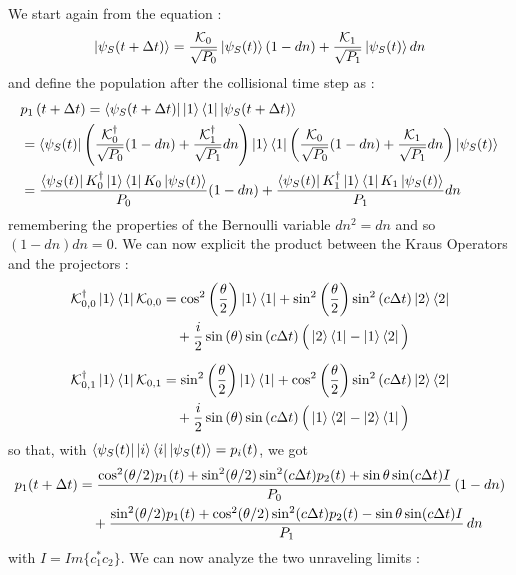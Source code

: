 \documentclass[a4paper,12pt]{article}
\begin{document}
We start again from the equation : 
\begin{equation}
	\ket{\psi_{S}(t + \Delta t)} = \frac{\mathcal{K}_{0}}{\sqrt{P_{0}}} \ket{\psi_{S}(t)} (1 - dn) + \frac{\mathcal{K}_{1}}{\sqrt{P_{1}}} \ket{\psi_{S}(t)} dn
\end{equation}
and define the population after the collisional time step as : 
\begin{align}
	&p_{1} \left( t + \Delta t \right) = \bra{\psi_{S}(t + \Delta t)} \ket{1} \bra{1} \ket{\psi_{S}(t + \Delta t)} \notag \\ 
	&= \bra{\psi_{S}(t)} \left( \frac{\mathcal{K}^{\dagger}_{0}}{\sqrt{P_{0}}}  (1 - dn) + \frac{\mathcal{K}^{\dagger}_{1}}{\sqrt{P_{1}} } dn\right) \ket{1} \bra{1} \left( \frac{\mathcal{K}_{0}}{\sqrt{P_{0}}} (1 - dn) + \frac{\mathcal{K}_{1}}{\sqrt{P_{1}}} dn \right) \ket{\psi_{S}(t)} \notag \\
	&= \frac{\bra{\psi_{S}(t)} {K}^{\dagger}_{0} \ket{1} \bra{1} {K}_{0} \ket{\psi_{S}(t)} }{P_{0}} (1-dn) + \frac{\bra{\psi_{S}(t)} {K}^{\dagger}_{1} \ket{1} \bra{1} {K}_{1} \ket{\psi_{S}(t)} }{P_{1}} dn
\end{align}
remembering the properties of the Bernoulli variable $ dn^{2} = dn $ and so $ (1-dn)dn = 0 $.
We can now explicit the product between the Kraus Operators and the projectors : 
\begin{align}
	\mathcal{K}_{0,0}^{\dagger} \ket{1}\bra{1} \mathcal{K}_{0,0} &= \cos^{2}\left(\frac{\theta}{2}\right) \ket{1}\bra{1} + \sin^{2}\left(\frac{\theta}{2}\right) \sin^{2}\left(c\Delta t\right) \ket{2}\bra{2} \notag \\
	&\quad + \frac{i}{2}\sin \left(\theta\right) \sin\left(c\Delta t\right) \Big( \ket{2}\bra{1} - \ket{1}\bra{2} \Big) \\[2mm]
	\mathcal{K}_{0,1}^{\dagger} \ket{1}\bra{1} \mathcal{K}_{0,1} &= \sin^{2}\left(\frac{\theta}{2}\right) \ket{1}\bra{1} + \cos^{2}\left(\frac{\theta}{2}\right) \sin^{2}\left(c\Delta t\right) \ket{2}\bra{2} \notag \\
	&\quad + \frac{i}{2}\sin \left(\theta\right) \sin\left(c\Delta t\right) \Big( \ket{1}\bra{2} - \ket{2}\bra{1} \Big)
	\label{eq:K01_1_projection}
\end{align}
so that, with $ \bra{\psi_{S}(t)} \ket{i} \bra{i} \ket{\psi_{S}(t)} = p_{i} (t) $, we got 
\begin{align}
	p_1(t+\Delta t) &= \frac{\cos^{2}(\theta/2)p_1(t) + \sin^{2}(\theta/2)\sin^{2}(c\Delta t)p_2(t) + \sin\theta\sin(c\Delta t)I}{P_0} \, (1-dn) \notag \\
	&\quad + \frac{\sin^{2}(\theta/2)p_1(t) + \cos^{2}(\theta/2)\sin^{2}(c\Delta t)p_2(t) - \sin\theta\sin(c\Delta t)I}{P_1} \, dn
	\label{eq:general_p1_evolution}
\end{align}
with $ I = \textit{Im} \{ c_{1}^{*} c_{2} \} $.
We can now analyze the two unraveling limits : 
\end{document}
